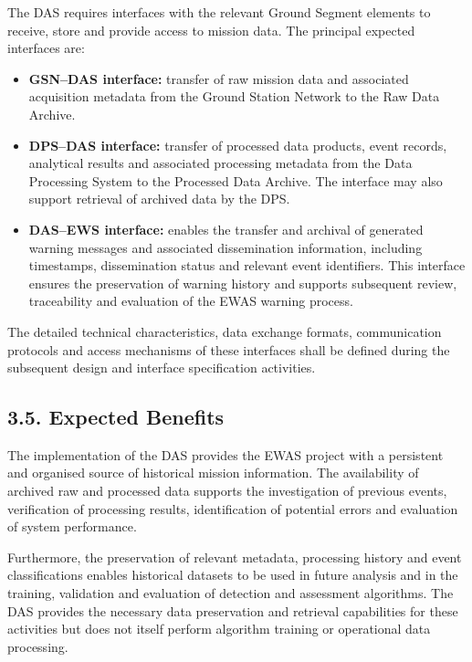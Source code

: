 The DAS requires interfaces with the relevant Ground Segment elements to receive, store and provide access to mission data. The principal expected interfaces are:

\begin{itemize}
    \item \textbf{GSN--DAS interface:} transfer of raw mission data and associated acquisition metadata from the Ground Station Network to the Raw Data Archive.
    \item \textbf{DPS--DAS interface:} transfer of processed data products, event records, analytical results and associated processing metadata from the Data Processing System to the Processed Data Archive. The interface may also support retrieval of archived data by the DPS.
    \item \textbf{DAS--EWS interface:} enables the transfer and archival of generated warning messages and associated dissemination information, including timestamps, dissemination status and relevant event identifiers. This interface ensures the preservation of warning history and supports subsequent review, traceability and evaluation of the EWAS warning process.
\end{itemize}

The detailed technical characteristics, data exchange formats, communication protocols and access mechanisms of these interfaces shall be defined during the subsequent design and interface specification activities.

\subsection{3.5. Expected Benefits}\label{expected-benefits}

The implementation of the DAS provides the EWAS project with a persistent and organised source of historical mission information. The availability of archived raw and processed data supports the investigation of previous events, verification of processing results, identification of potential errors and evaluation of system performance.

Furthermore, the preservation of relevant metadata, processing history and event classifications enables historical datasets to be used in future analysis and in the training, validation and evaluation of detection and assessment algorithms. The DAS provides the necessary data preservation and retrieval capabilities for these activities but does not itself perform algorithm training or operational data processing.
